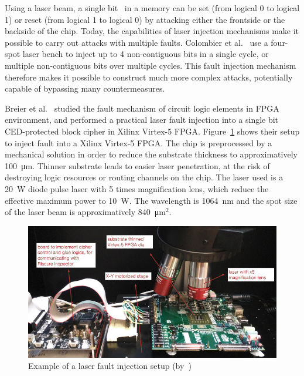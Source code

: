 Using a laser beam, a single bit~\cite{CMDMRD-19-host} in a memory can be set (from logical 0 to logical 1) or reset (from logical 1 to logical 0) by attacking either the frontside or the backside of the chip.
Today, the capabilities of laser injection mechanisms make it possible to carry out attacks with multiple faults.
Colombier et al.~\cite{CGVCBLC-22-cardis} use a four-spot laser bench to inject up to 4 non-contiguous bits in a single cycle, or multiple non-contiguous bits over multiple cycles. This fault injection mechanism therefore makes it possible to construct much more complex attacks, potentially capable of bypassing many countermeasures.

Breier et al.~\cite{JHJBC-17-hss} studied the fault mechanism of circuit logic elements in FPGA environment, and performed a practical laser fault injection into a single bit CED-protected block cipher in Xilinx Virtex-5 FPGA.
Figure~\ref{fig:lfi_setup} shows their setup to inject fault into a Xilinx Virtex-5 FPGA.
The chip is preprocessed by a mechanical solution in order to reduce the substrate thickness to approximatively \SI{100}{\micro\metre}. Thinner substrate leads to easier laser penetration, at the risk of destroying logic resources or routing channels on the chip.
The laser used is a \SI{20}{\watt} diode pulse laser with 5 times magnification lens, which reduce the effective maximum power to \SI{10}{\watt}. The wavelength is \SI{1064}{\nano\metre} and the spot size of the laser beam is approximatively \SI{840}{\micro\metre}$^2$.

\begin{figure}[ht]
    \centering
    \includegraphics[width=\textwidth]{c2_soa/img/lfi_setup.png}
    \caption{Example of a laser fault injection setup (by~\cite{JHJBC-17-hss})}
    \label{fig:lfi_setup}
\end{figure}

